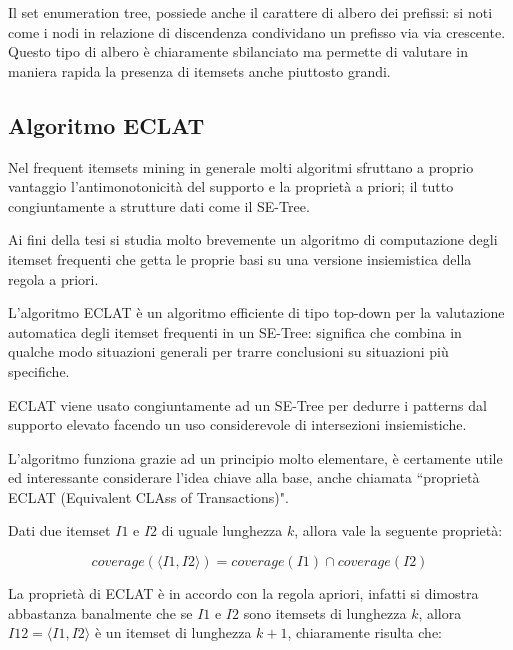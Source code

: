 Il set enumeration tree, possiede anche il carattere di albero dei prefissi: si noti come i nodi in relazione di discendenza condividano un prefisso via via crescente. Questo tipo di albero {\`e} chiaramente sbilanciato ma permette di valutare in maniera rapida la presenza di itemsets anche piuttosto grandi.

\subsection{Algoritmo ECLAT}

Nel frequent itemsets mining in generale molti algoritmi sfruttano a proprio vantaggio l'antimonotonicit{\`a} del supporto e la propriet{\`a} a priori; il tutto congiuntamente a strutture dati come il SE-Tree. 

Ai fini della tesi si studia molto brevemente un algoritmo di computazione degli itemset frequenti che getta le proprie basi su una versione insiemistica della regola a priori.

L'algoritmo ECLAT \cite{eclat} {\`e} un algoritmo efficiente di tipo top-down per la valutazione automatica degli itemset frequenti in un SE-Tree: significa che combina in qualche modo situazioni generali per trarre conclusioni su situazioni pi{\`u} specifiche.

ECLAT viene usato congiuntamente ad un SE-Tree per dedurre i patterns dal supporto elevato facendo un uso considerevole di intersezioni insiemistiche.

L'algoritmo funziona grazie ad un principio molto elementare, {\`e} certamente utile ed interessante considerare l'idea chiave alla base, anche chiamata ``propriet{\`a} ECLAT (Equivalent CLAss of Transactions)".

\begin{defn}
Dati due itemset \( I1 \) e \( I2 \) di uguale lunghezza \( k \), allora vale la seguente propriet{\`a}:

\begin{equation}
coverage( \langle I1,I2 \rangle ) = coverage(I1) \cap coverage(I2)
\end{equation}

\end{defn}

La propriet{\`a} di ECLAT {\`e} in accordo con la regola apriori, infatti si dimostra abbastanza banalmente che se \( I1 \) e \( I2 \) sono itemsets di lunghezza \( k \), allora \\ $I12 = \langle I1,I2 \rangle$ {\`e} un itemset di lunghezza \( k + 1 \), chiaramente risulta che:

